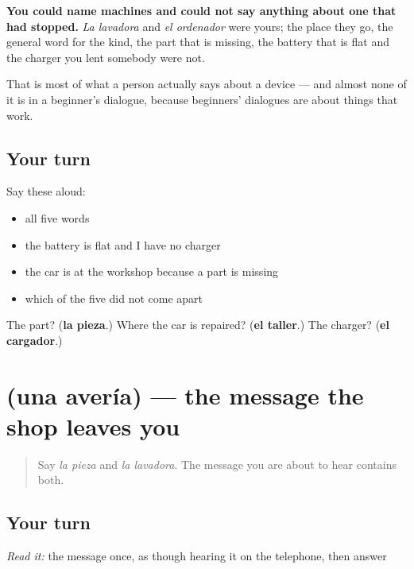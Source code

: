 \begin{grammarlens}[title={What you've built}]
\textbf{You could name machines and could not say anything about one that had stopped.} \emph{La lavadora} and \emph{el ordenador} were yours; the place they go, the general word for the kind, the part that is missing, the battery that is flat and the charger you lent somebody were not.

That is most of what a person actually says about a device — and almost none of it is in a beginner's dialogue, because beginners' dialogues are about things that work.
\end{grammarlens}

\subsection*{Your turn}
Say these aloud:

\begin{itemize}
\raggedright
  \item all five words
  \item the battery is flat and I have no charger
  \item the car is at the workshop because a part is missing
  \item which of the five did not come apart
\end{itemize}

\begin{tcolorbox}[breakable,colback=teal!4,colframe=teal!35!black,title={Before you move on}]
The part? (\textbf{la pieza}.) Where the car is repaired? (\textbf{el taller}.) The charger? (\textbf{el cargador}.)
\end{tcolorbox}
\section[Practice]{(una avería) — the message the shop leaves you}

\label{lesson:ES-C434-sintesis-averia}



\begin{quote}
Say \emph{la pieza} and \emph{la lavadora}. The message you are about to hear contains both.
\end{quote}

\subsection*{Your turn}
\emph{Read it:} the message once, as though hearing it on the telephone, then answer

